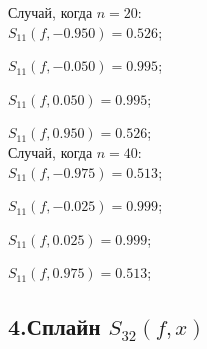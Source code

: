 \documentclass[rus, 12 pt]{article}
\begin{document}
    
    Случай, когда $n=20$:\\

    
    

    
    $S_{11}(f,-0.950)=0.526$;

    
    $S_{11}(f,-0.050)=0.995$;

    
    $S_{11}(f,0.050)=0.995$;

    
    $S_{11}(f,0.950)=0.526$;\\

    
    

    
    Случай, когда $n=40$:\\

    
    

    
    $S_{11}(f,-0.975)=0.513$;

    
    $S_{11}(f,-0.025)=0.999$;

    
    $S_{11}(f,0.025)=0.999$;

    
    $S_{11}(f,0.975)=0.513$;\\

    
    

    
    \hypertarget{ux441ux43fux43bux430ux439ux43d-s_32fx}{%
\subsection{\texorpdfstring{4.Сплайн
\(S_{32}(f,x)\)}{4.Сплайн S\_\{32\}(f,x)}}\label{ux441ux43fux43bux430ux439ux43d-s_32fx}}
\end{document}
